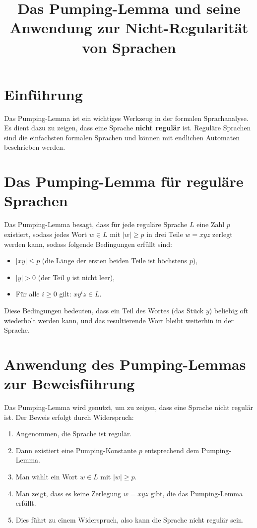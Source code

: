 \documentclass{article}
\title{Das Pumping-Lemma und seine Anwendung zur Nicht-Regularität von Sprachen}
\author{}
\date{}
\begin{document}
	
	\maketitle
	
	\section{Einführung}
	Das Pumping-Lemma ist ein wichtiges Werkzeug in der formalen Sprachanalyse. Es dient dazu zu zeigen, dass eine Sprache \textbf{nicht regulär} ist. Reguläre Sprachen sind die einfachsten formalen Sprachen und können mit endlichen Automaten beschrieben werden.
	
	\section{Das Pumping-Lemma für reguläre Sprachen}
	Das Pumping-Lemma besagt, dass für jede reguläre Sprache $L$ eine Zahl $p$ existiert, sodass jedes Wort $w \in L$ mit $|w| \geq p$ in drei Teile $w = xyz$ zerlegt werden kann, sodass folgende Bedingungen erfüllt sind:
	
	\begin{itemize}
		\item $|xy| \leq p$ (die Länge der ersten beiden Teile ist höchstens $p$),
		\item $|y| > 0$ (der Teil $y$ ist nicht leer),
		\item Für alle $i \geq 0$ gilt: $xy^i z \in L$.
	\end{itemize}
	
	Diese Bedingungen bedeuten, dass ein Teil des Wortes (das Stück $y$) beliebig oft wiederholt werden kann, und das resultierende Wort bleibt weiterhin in der Sprache.
	
	\section{Anwendung des Pumping-Lemmas zur Beweisführung}
	Das Pumping-Lemma wird genutzt, um zu zeigen, dass eine Sprache nicht regulär ist. Der Beweis erfolgt durch Widerspruch:
	
	\begin{enumerate}
		\item Angenommen, die Sprache ist regulär.
		\item Dann existiert eine Pumping-Konstante $p$ entsprechend dem Pumping-Lemma.
		\item Man wählt ein Wort $w \in L$ mit $|w| \geq p$.
		\item Man zeigt, dass es keine Zerlegung $w = xyz$ gibt, die das Pumping-Lemma erfüllt.
		\item Dies führt zu einem Widerspruch, also kann die Sprache nicht regulär sein.
	\end{enumerate}
	
\end{document}
